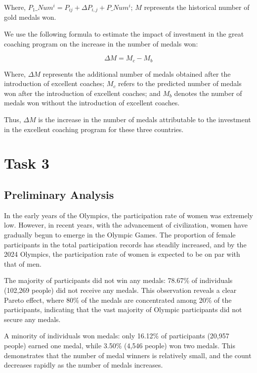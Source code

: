 \documentclass{mcmthesis}
\begin{document}
Where, $P_{1}\_Num^{i}=P_{ij} + \Delta P_{i, j} + P\_Num^{i}$; $M$ represents the historical number of gold medals won.

We use the following formula to estimate the impact of investment in the great coaching program on the increase in the number of medals won:

\begin{equation}
\Delta M=M_{c} - M_{b}
\end{equation}

Where, $\Delta M$ represents the additional number of medals obtained after the introduction of excellent coaches; $M_{c}$ refers to the predicted number of medals won after the introduction of excellent coaches; and $M_{b}$ denotes the number of medals won without the introduction of excellent coaches.

Thus, $\Delta M$ is the increase in the number of medals attributable to the investment in the excellent coaching program for these three countries.

\section{Task 3}

\subsection{Preliminary Analysis}
In the early years of the Olympics, the participation rate of women was extremely low. However, in recent years, with the advancement of civilization, women have gradually begun to emerge in the Olympic Games. The proportion of female participants in the total participation records has steadily increased, and by the 2024 Olympics, the participation rate of women is expected to be on par with that of men.

The majority of participants did not win any medals: 78.67\% of individuals (102,269 people) did not receive any medals. This observation reveals a clear Pareto effect, where 80\% of the medals are concentrated among 20\% of the participants, indicating that the vast majority of Olympic participants did not secure any medals.

A minority of individuals won medals: only 16.12\% of participants (20,957 people) earned one medal, while 3.50\% (4,546 people) won two medals. This demonstrates that the number of medal winners is relatively small, and the count decreases rapidly as the number of medals increases.
\end{document}
